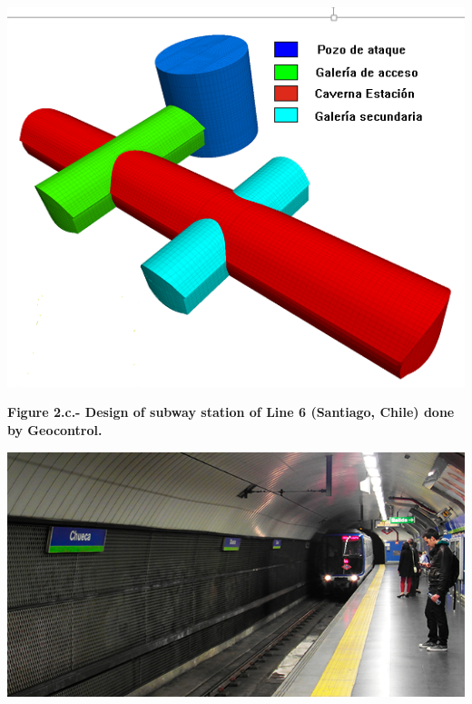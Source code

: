 \documentclass{article}
\begin{document}
\begin{mdcenter}%

\noindent{}\includegraphics[keepaspectratio=true,width=\dimmin{}{\dimwidth{0.40}}]{images/Fig-2.c}{}%
\end{mdcenter}%

\begin{mdcenter}%

\noindent{}\textbf{Figure 2.c.- Design of subway station of Line 6 (Santiago, Chile) done by Geocontrol.}%
\end{mdcenter}%

\begin{mdcenter}%

\noindent{}\includegraphics[keepaspectratio=true,width=\dimmin{}{\dimwidth{0.40}}]{images/Fig-2.d}{}%
\end{mdcenter}%
\end{document}
